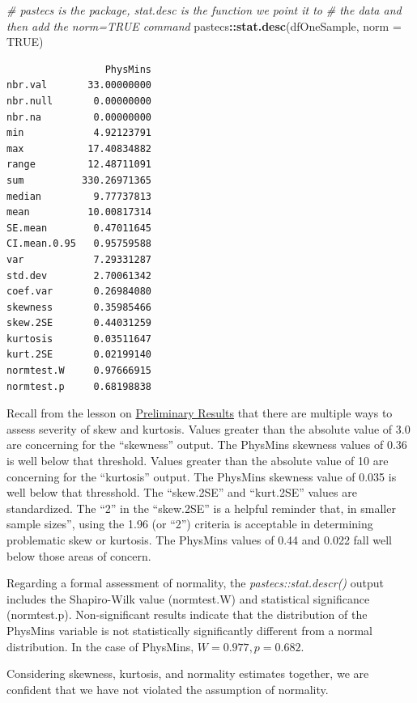 \documentclass[
  11pt,
]{book}
\newenvironment{Shaded}{\begin{snugshade}}{\end{snugshade}}
\newcommand{\AttributeTok}[1]{\textcolor[rgb]{0.27,0.27,0.27}{#1}}
\newcommand{\CommentTok}[1]{\textcolor[rgb]{0.37,0.37,0.37}{\textit{#1}}}
\newcommand{\ConstantTok}[1]{\textcolor[rgb]{0.37,0.37,0.37}{#1}}
\newcommand{\FunctionTok}[1]{\textcolor[rgb]{0.27,0.27,0.27}{\textbf{#1}}}
\newcommand{\NormalTok}[1]{#1}
\newcommand{\SpecialCharTok}[1]{\textcolor[rgb]{0.43,0.43,0.43}{\textbf{#1}}}
\begin{document}
\begin{Shaded}
\begin{Highlighting}[]
\CommentTok{\# pastecs is the package, stat.desc is the function we point it to}
\CommentTok{\# the data and then add the norm=TRUE command}
\NormalTok{pastecs}\SpecialCharTok{::}\FunctionTok{stat.desc}\NormalTok{(dfOneSample, }\AttributeTok{norm =} \ConstantTok{TRUE}\NormalTok{)}
\end{Highlighting}
\end{Shaded}

\begin{verbatim}
                 PhysMins
nbr.val       33.00000000
nbr.null       0.00000000
nbr.na         0.00000000
min            4.92123791
max           17.40834882
range         12.48711091
sum          330.26971365
median         9.77737813
mean          10.00817314
SE.mean        0.47011645
CI.mean.0.95   0.95759588
var            7.29331287
std.dev        2.70061342
coef.var       0.26984080
skewness       0.35985466
skew.2SE       0.44031259
kurtosis       0.03511647
kurt.2SE       0.02199140
normtest.W     0.97666915
normtest.p     0.68198838
\end{verbatim}

Recall from the lesson on \protect\hyperlink{preliminaries}{Preliminary Results} that there are multiple ways to assess severity of skew and kurtosis. Values greater than the absolute value of 3.0 are concerning for the ``skewness'' output. The PhysMins skewness values of 0.36 is well below that threshold. Values greater than the absolute value of 10 are concerning for the ``kurtosis'' output. The PhysMins skewness value of 0.035 is well below that thresshold. The ``skew.2SE'' and ``kurt.2SE'' values are standardized. The ``2'' in the ``skew.2SE'' is a helpful reminder that, in smaller sample sizes'', using the 1.96 (or ``2'') criteria is acceptable in determining problematic skew or kurtosis. The PhysMins values of 0.44 and 0.022 fall well below those areas of concern.

Regarding a formal assessment of normality, the \emph{pastecs::stat.descr()} output includes the Shapiro-Wilk value (normtest.W) and statistical significance (normtest.p). Non-significant results indicate that the distribution of the PhysMins variable is not statistically significantly different from a normal distribution. In the case of PhysMins, \(W = 0.977, p = 0.682\).

Considering skewness, kurtosis, and normality estimates together, we are confident that we have not violated the assumption of normality.
\end{document}
